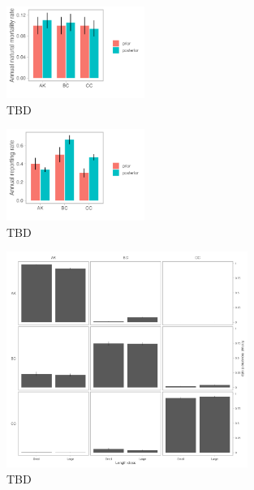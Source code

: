 \documentclass{article}
\begin{document}
\begin{figure}[htb]
    \centering
    \includegraphics[width = 0.4\textwidth]{bar-regions-3-mortality-priors-posteriors}
    \caption{TBD}
    \label{fig:bar-regions-3-mortality-priors-posteriors}
\end{figure}

\begin{figure}[htb]
    \centering
    \includegraphics[width = 0.4\textwidth]{bar-regions-3-reporting-priors-posteriors}
    \caption{TBD}
    \label{fig:bar-regions-3-reporting-priors-posteriors}
\end{figure}

\begin{figure}[htb]
    \centering
    \includegraphics[width = 0.7\textwidth]{bar-regions-3-size}
    \caption{TBD}
    \label{fig:bar-regions-3-size}
\end{figure}
\end{document}
